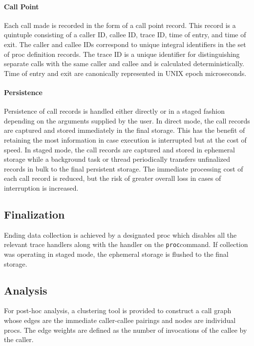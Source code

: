 \documentclass{article}[letter,10pt]
\begin{document}
{{    \paragraph{Call Point}{
      Each call made is recorded in the form of a call point record. This record
      is a quintuple consisting of a caller ID, callee ID, trace ID, time of
      entry, and time of exit. The caller and callee IDs correspond to unique
      integral identifiers in the set of proc definition records. The trace ID is a
      unique identifier for distinguishing separate calls with the same caller
      and callee and is calculated deterministically. Time of entry and exit are
      canonically represented in UNIX epoch microseconds.
    }
    \paragraph{Persistence}{
      Persistence of call records is handled either directly or in a staged fashion
      depending on the arguments supplied by the user. In direct mode, the call
      records are captured and stored immediately in the final storage. This has
      the benefit of retaining the most information in case execution is interrupted
      but at the cost of speed. In staged mode, the call records are captured and
      stored in ephemeral storage while a background task or thread periodically
      transfers unfinalized records in bulk to the final persistent storage. The
      immediate processing cost of each call record is reduced, but the risk of
      greater overall loss in cases of interruption is increased.
    }
  }
  \subsection{Finalization}{
    Ending data collection is achieved by a designated proc which disables
    all the relevant trace handlers along with the handler on the \texttt{proc}command.
    If collection was operating in staged mode, the ephemeral storage is flushed
    to the final storage.
  }
  \subsection{Analysis}{
    For post-hoc analysis, a clustering tool is provided to construct a call graph
    whose edges are the immediate caller-callee pairings and nodes are individual
    procs. The edge weights are defined as the number of invocations of the callee
    by the caller.

}}
\end{document}
